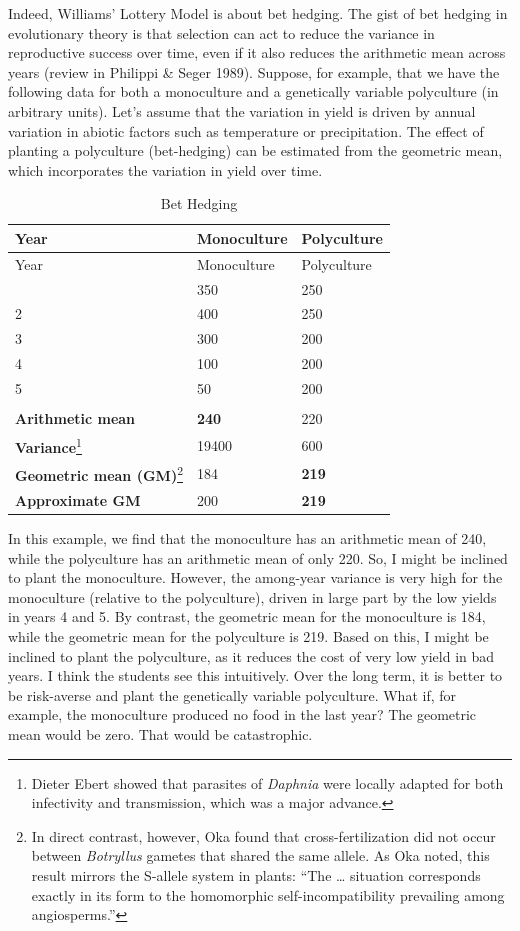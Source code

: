 \documentclass[
  letterpaper,
]{book}
\begin{document}
Indeed, Williams' Lottery Model is about bet hedging. The gist of bet
hedging in evolutionary theory is that selection can act to reduce the
variance in reproductive success over time, even if it also reduces the
arithmetic mean across years (review in Philippi \& Seger 1989).
Suppose, for example, that we have the following data for both a
monoculture and a genetically variable polyculture (in arbitrary units).
Let's assume that the variation in yield is driven by annual variation
in abiotic factors such as temperature or precipitation. The effect of
planting a polyculture (bet-hedging) can be estimated from the geometric
mean, which incorporates the variation in yield over time.

\begin{longtable}[]{@{}lll@{}}
\caption{Bet Hedging}\label{tbl-bh}\tabularnewline
\toprule\noalign{}
Year & Monoculture & Polyculture \\
\midrule\noalign{}
\endfirsthead
\toprule\noalign{}
Year & Monoculture & Polyculture \\
\midrule\noalign{}
\endhead
\bottomrule\noalign{}
\endlastfoot
1 & 350 & 250 \\
2 & 400 & 250 \\
3 & 300 & 200 \\
4 & 100 & 200 \\
5 & 50 & 200 \\
& & \\
\textbf{Arithmetic mean} & \textbf{240} & 220 \\
\textbf{Variance}\footnote{Dieter Ebert showed that parasites of
  \emph{Daphnia} were locally adapted for both infectivity and
  transmission, which was a major advance.} & 19400 & 600 \\
\textbf{Geometric mean (GM)}\footnote{In direct contrast, however, Oka
  found that cross-fertilization did not occur between \emph{Botryllus}
  gametes that shared the same allele. As Oka noted, this result mirrors
  the S-allele system in plants: ``The \ldots{} situation corresponds
  exactly in its form to the homomorphic self-incompatibility prevailing
  among angiosperms.''} & 184 & \textbf{219} \\
\textbf{Approximate GM} & 200 & \textbf{219} \\
\end{longtable}

In this example, we find that the monoculture has an arithmetic mean of
240, while the polyculture has an arithmetic mean of only 220. So, I
might be inclined to plant the monoculture. However, the among-year
variance is very high for the monoculture (relative to the polyculture),
driven in large part by the low yields in years 4 and 5. By contrast,
the geometric mean for the monoculture is 184, while the geometric mean
for the polyculture is 219. Based on this, I might be inclined to plant
the polyculture, as it reduces the cost of very low yield in bad years.
I think the students see this intuitively. Over the long term, it is
better to be risk-averse and plant the genetically variable polyculture.
What if, for example, the monoculture produced no food in the last year?
The geometric mean would be zero. That would be catastrophic.
\end{document}
